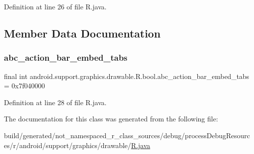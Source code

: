 Definition at line 26 of file R.\+java.


\begin{DoxyCode}{0}

\end{DoxyCode}


\subsection{Member Data Documentation}
\mbox{\label{classandroid_1_1support_1_1graphics_1_1drawable_1_1_r_1_1bool_a7458f074ec76e2f07e8e86a776e918a4}} 
\subsubsection{\texorpdfstring{abc\_action\_bar\_embed\_tabs}{abc\_action\_bar\_embed\_tabs}}
{\footnotesize\ttfamily final int android.\+support.\+graphics.\+drawable.\+R.\+bool.\+abc\+\_\+action\+\_\+bar\+\_\+embed\+\_\+tabs = 0x7f040000\hspace{0.3cm}{\ttfamily [static]}}



Definition at line 28 of file R.\+java.



The documentation for this class was generated from the following file\+:\begin{DoxyCompactItemize}
\item 
build/generated/not\+\_\+namespaced\+\_\+r\+\_\+class\+\_\+sources/debug/process\+Debug\+Resources/r/android/support/graphics/drawable/\mbox{\hyperlink{android_2support_2graphics_2drawable_2_r_8java}{R.\+java}}\end{DoxyCompactItemize}
